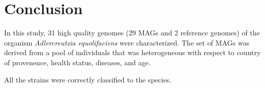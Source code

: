 \section*{Conclusion}

In this study, 31 high quality genomes (29 MAGs and 2 reference genomes)
of the organism \emph{Adlercreutzia equolifaciens} were characterized.
The set of MAGs was derived from a pool of individuals that was heterogeneous
with respect to country of provenence, health status, diseases, and age. 

All the strains were correctly classified to the species. 





